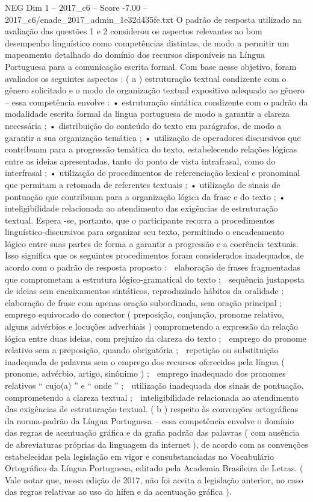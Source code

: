 \begin{textsample}{NEG Dim 1 – 2017\_c6 – Score -7.00 – 2017\_c6/enade\_2017\_admin\_1e32d435fe.txt}
O padrão de resposta utilizado na avaliação das questões 1 e 2 considerou os aspectos relevantes ao bom desempenho linguístico como competências distintas, de modo a permitir um mapeamento detalhado do domínio dos recursos disponíveis na Língua Portuguesa para a comunicação escrita formal.
Com base nesse objetivo, foram avaliados os seguintes aspectos : ( a ) estruturação textual condizente com o gênero solicitado e o modo de organização textual expositivo adequado ao gênero – essa competência envolve : • estruturação sintática condizente com o padrão da modalidade escrita formal da língua portuguesa de modo a garantir a clareza necessária ; • distribuição do conteúdo do texto em parágrafos, de modo a garantir a sua organização temática ; • utilização de operadores discursivos que contribuam para a progressão temática do texto, estabelecendo relações lógicas entre as ideias apresentadas, tanto do ponto de vista intrafrasal, como do interfrasal ; • utilização de procedimentos de referenciação lexical e pronominal que permitam a retomada de referentes textuais ; • utilização de sinais de pontuação que contribuam para a organização lógica da frase e do texto ; • inteligibilidade relacionada ao atendimento das exigências de estruturação textual.
Espera -se, portanto, que o participante recorra a procedimentos linguístico-discursivos para organizar seu texto, permitindo o encadeamento lógico entre suas partes de forma a garantir a progressão e a coerência textuais.
Isso significa que os seguintes procedimentos foram considerados inadequados, de acordo com o padrão de resposta proposto :  elaboração de frases fragmentadas que comprometam a estrutura lógico-gramatical do texto ;  sequência justaposta de ideias sem encaixamentos sintáticos, reproduzindo hábitos da oralidade ;  elaboração de frase com apenas oração subordinada, sem oração principal ;  emprego equivocado do conector ( preposição, conjunção, pronome relativo, alguns advérbios e locuções adverbiais ) comprometendo a expressão da relação lógica entre duas ideias, com prejuízo da clareza do texto ;  emprego do pronome relativo sem a preposição, quando obrigatória ;  repetição ou substituição inadequada de palavras sem o emprego dos recursos oferecidos pela língua ( pronome, advérbio, artigo, sinônimo ) ;  emprego inadequado dos pronomes relativos “ cujo(a) ” e “ onde ” ;  utilização inadequada dos sinais de pontuação, comprometendo a clareza textual ;  inteligibilidade relacionada ao atendimento das exigências de estruturação textual. ( b ) respeito às convenções ortográficas da norma-padrão da Língua Portuguesa – essa competência envolve o domínio das regras de acentuação gráfica e da grafia padrão das palavras ( com ausência de abreviaturas próprias da linguagem da internet ), de acordo com as convenções estabelecidas pela legislação em vigor e consubstanciadas no Vocabulário Ortográfico da Língua Portuguesa, editado pela Academia Brasileira de Letras. ( Vale notar que, nessa edição de 2017, não foi aceita a legislação anterior, no caso das regras relativas ao uso do hífen e da acentuação gráfica ).

\end{textsample}

